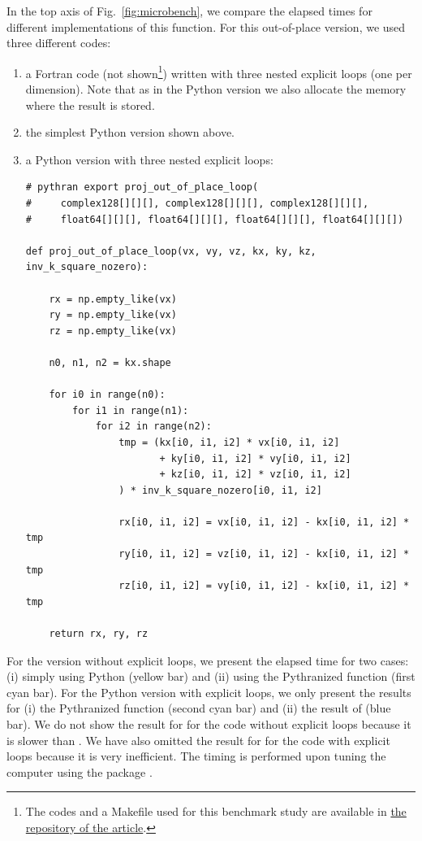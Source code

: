 In the top axis of Fig.~\ref{fig:microbench}, we compare the elapsed times for
different implementations of this function.
%
For this out-of-place version, we used three different codes:
\begin{enumerate}
\item a Fortran code (not shown\footnote{The codes and a Makefile used for this
benchmark study are available in \href{%
https://bitbucket.org/fluiddyn/fluiddyn_paper/src/default/fluidfft/microbench/}{%
the repository of the article}.}) written with three nested explicit loops (one
per dimension). Note that as in the Python version we also allocate the memory
where the result is stored.
\item the simplest Python version shown above.
\item a Python version with three nested explicit loops:
\begin{verbatim}
# pythran export proj_out_of_place_loop(
#     complex128[][][], complex128[][][], complex128[][][],
#     float64[][][], float64[][][], float64[][][], float64[][][])

def proj_out_of_place_loop(vx, vy, vz, kx, ky, kz, inv_k_square_nozero):

    rx = np.empty_like(vx)
    ry = np.empty_like(vx)
    rz = np.empty_like(vx)

    n0, n1, n2 = kx.shape

    for i0 in range(n0):
        for i1 in range(n1):
            for i2 in range(n2):
                tmp = (kx[i0, i1, i2] * vx[i0, i1, i2]
                       + ky[i0, i1, i2] * vy[i0, i1, i2]
                       + kz[i0, i1, i2] * vz[i0, i1, i2]
                ) * inv_k_square_nozero[i0, i1, i2]

                rx[i0, i1, i2] = vx[i0, i1, i2] - kx[i0, i1, i2] * tmp
                ry[i0, i1, i2] = vz[i0, i1, i2] - kx[i0, i1, i2] * tmp
                rz[i0, i1, i2] = vy[i0, i1, i2] - kx[i0, i1, i2] * tmp

    return rx, ry, rz
\end{verbatim}
\end{enumerate}
For the version without explicit loops, we present the elapsed time for two
cases: (i) simply using Python (yellow bar) and (ii) using the Pythranized
function (first cyan bar).
%
For the Python version with explicit loops, we only present the results for (i)
the Pythranized function (second cyan bar) and (ii) the result of 
(blue bar).
%
We do not show the result for  for the code without explicit loops
because it is slower than . We have also omitted the result for
 for the code with explicit loops because it is very inefficient.
%
The timing is performed upon tuning the computer using the package
\href{https://pypi.org/project/perf/}{}.

